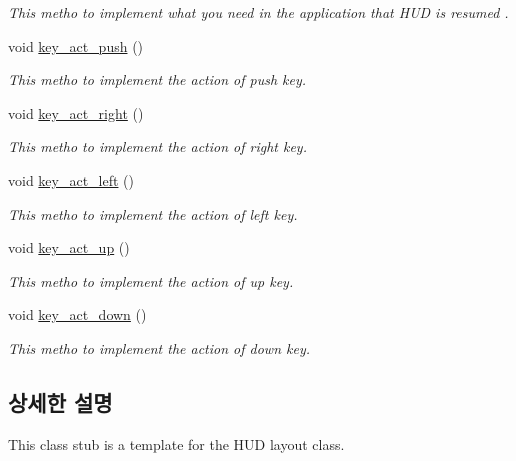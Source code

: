 \begin{DoxyCompactItemize}
\begin{DoxyCompactList}\small\item\em This metho to implement what you need in the application that H\+U\+D is resumed . \end{DoxyCompactList}\item 
void \hyperlink{classkr_1_1ac_1_1kookmin_1_1cs_1_1hud_1_1_h_u_d_class_template_a030e54909c369e4b0e43b551561e238d}{key\+\_\+act\+\_\+push} ()
\begin{DoxyCompactList}\small\item\em This metho to implement the action of push key. \end{DoxyCompactList}\item 
void \hyperlink{classkr_1_1ac_1_1kookmin_1_1cs_1_1hud_1_1_h_u_d_class_template_affc56ae2354935530ed2bd0c580d32f0}{key\+\_\+act\+\_\+right} ()
\begin{DoxyCompactList}\small\item\em This metho to implement the action of right key. \end{DoxyCompactList}\item 
void \hyperlink{classkr_1_1ac_1_1kookmin_1_1cs_1_1hud_1_1_h_u_d_class_template_a475ddeb053862cfd976e4a5a1548340e}{key\+\_\+act\+\_\+left} ()
\begin{DoxyCompactList}\small\item\em This metho to implement the action of left key. \end{DoxyCompactList}\item 
void \hyperlink{classkr_1_1ac_1_1kookmin_1_1cs_1_1hud_1_1_h_u_d_class_template_a6997c3296b9aa23172090ba4c03b0604}{key\+\_\+act\+\_\+up} ()
\begin{DoxyCompactList}\small\item\em This metho to implement the action of up key. \end{DoxyCompactList}\item 
void \hyperlink{classkr_1_1ac_1_1kookmin_1_1cs_1_1hud_1_1_h_u_d_class_template_a56b533f34b6b984287388a344e732e00}{key\+\_\+act\+\_\+down} ()
\begin{DoxyCompactList}\small\item\em This metho to implement the action of down key. \end{DoxyCompactList}\end{DoxyCompactItemize}


\subsection{상세한 설명}
This class stub is a template for the H\+U\+D layout class. 

